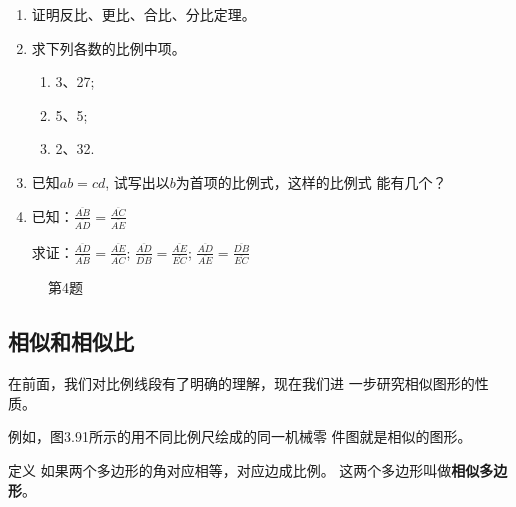 \begin{ex}
\begin{enumerate}
    \item 证明反比、更比、合比、分比定理。
    \item 求下列各数的比例中项。
\begin{multicols}{3}
    \begin{enumerate}
        \item 3、27;
        \item 5、5;
        \item 2、32.
    \end{enumerate}
\end{multicols}
\item 已知$ab=cd$, 试写出以$b$为首项的比例式，这样的比例式
    能有几个？
    \item 已知：$\frac{\overline{AB}}{\overline{AD}}=\frac{\overline{AC}}{\overline{AE}}$

    求证：$\frac{\overline{AD}}{\overline{AB}}=\frac{\overline{AE}}{\overline{AC}}$; $\frac{\overline{AD}}{\overline{DB}}=\frac{\overline{AE}}{\overline{EC}}$; $\frac{\overline{AD}}{\overline{AE}}=\frac{\overline{DB}}{\overline{EC}}$
\end{enumerate}
\end{ex}

\begin{figure}[htp]
    \centering
{}
    \caption*{第4题}
\end{figure}


\subsection{相似和相似比}
在前面，我们对比例线段有了明确的理解，现在我们进
一步研究相似图形的性质。

例如，图3.91所示的用不同比例尺绘成的同一机械零
件图就是相似的图形。

\begin{blk}
    {定义} 如果两个多边形的角对应相等，对应边成比例。
这两个多边形叫做\textbf{相似多边形}。
\end{blk}

